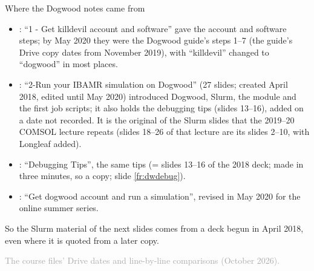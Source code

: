 \documentclass[aspectratio=169,11pt]{beamer}
\newcommand{\sourcecredit}[1]{\vfill\begin{flushright}\tiny\textcolor{DarkGray}{#1}\end{flushright}}
\begin{document}
\begin{frame}{Where the Dogwood notes came from}
\label{fr:dwsources}
\small
\begin{itemize}\setlength{\itemsep}{3pt}
  \item {}: ``1 - Get killdevil account and software'' gave the account and software steps; by May 2020 they were the Dogwood guide's steps 1--7 (the guide's Drive copy dates from November 2019), with ``killdevil'' changed to ``dogwood'' in most places.
  \item {}: ``2-Run your IBAMR simulation on Dogwood'' (27 slides; created April 2018, edited until May 2020) introduced Dogwood, Slurm, the  module and the first job scripts; it also holds the debugging tips (slides 13--16), added on a date not recorded. It is the original of the Slurm slides that the 2019--20 COMSOL lecture repeats (slides 18--26 of that lecture are its slides 2--10, with Longleaf added).
  \item {}: ``Debugging Tips'', the same tips (= slides 13--16 of the 2018 deck; made in three minutes, so a copy; slide \ref{fr:dwdebug}).
  \item {}: ``Get dogwood account and run a simulation'', revised in May 2020 for the online summer series.
\end{itemize}
\vspace{2mm}
\footnotesize So the Slurm material of the next slides comes from a deck begun in April 2018, even where it is quoted from a later copy.
\sourcecredit{The course files' Drive dates and line-by-line comparisons (October 2026).}
\end{frame}
\end{document}
